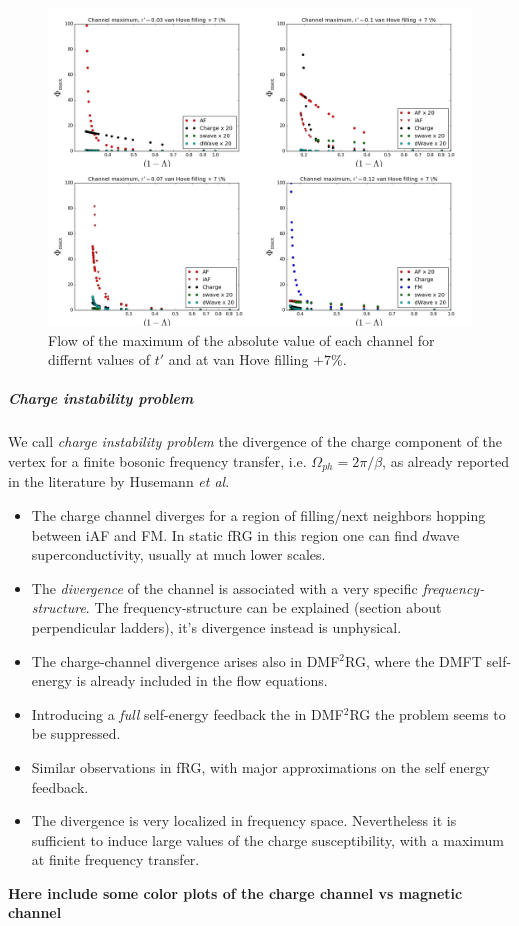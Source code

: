 \begin{figure}
\includegraphics[scale=0.25]{images/vanhovepluslambda.png}
\caption{Flow of the maximum of the absolute value of each channel for differnt values of $t'$ and at van Hove filling $+7 \%$.
} 
\label{lamvanplus} 
\end{figure}

\subparagraph{Charge instability problem}

We call \textit{charge instability problem} the divergence of the charge component of the vertex for a finite bosonic frequency transfer, i.e. $\Omega_{ph} = 2\pi/\beta$, as already reported in the literature by Husemann \emph{et al}. 
\begin{itemize}
\item The charge channel diverges for a region of filling/next neighbors hopping between iAF and FM. In static fRG in this region one can find $d$wave superconductivity, usually at much lower scales. 
\item The \textit{divergence} of the channel is associated with a very specific \textit{frequency-structure}. The frequency-structure can be explained (section about perpendicular ladders), it's divergence instead is unphysical. 
\item The charge-channel divergence arises also in DMF$^2$RG, where the DMFT self-energy is already included in the flow equations. 
\item Introducing a \emph{full} self-energy feedback the in DMF$^2$RG the problem seems to be suppressed. 
\item Similar observations in fRG, with major approximations on the self energy feedback.
\item The divergence is very localized in frequency space. Nevertheless it is sufficient to induce large values of the charge susceptibility, with a maximum at finite frequency transfer.    
\end{itemize} 
 
\textbf{Here include some color plots of the charge channel vs magnetic channel}

